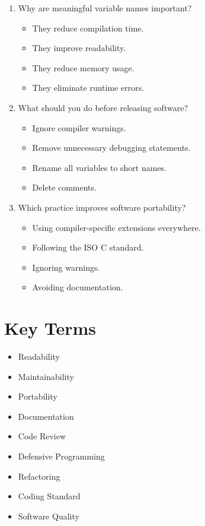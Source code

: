 \documentclass[12pt,openany]{book}
\begin{document}
\begin{enumerate}
    \item Why are meaningful variable names important?
    \begin{itemize}
        \item They reduce compilation time.
        \item They improve readability.
        \item They reduce memory usage.
        \item They eliminate runtime errors.
    \end{itemize}

    \item What should you do before releasing software?
    \begin{itemize}
        \item Ignore compiler warnings.
        \item Remove unnecessary debugging statements.
        \item Rename all variables to short names.
        \item Delete comments.
    \end{itemize}

    \item Which practice improves software portability?
    \begin{itemize}
        \item Using compiler-specific extensions everywhere.
        \item Following the ISO C standard.
        \item Ignoring warnings.
        \item Avoiding documentation.
    \end{itemize}
\end{enumerate}

\section{Key Terms}

\begin{itemize}
    \item Readability
    \item Maintainability
    \item Portability
    \item Documentation
    \item Code Review
    \item Defensive Programming
    \item Refactoring
    \item Coding Standard
    \item Software Quality
\end{itemize}
\end{document}
